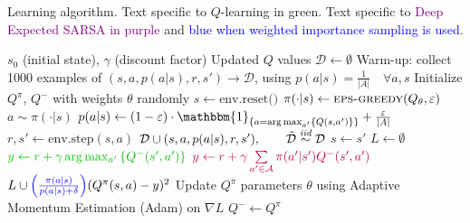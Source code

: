 \documentclass{article}
\begin{document}
\begin{algorithm}
    \caption{Learning algorithm. Text specific to \textcolor{dgreen}{\(Q\)-learning in green}. Text specific to \textcolor{purple}{Deep Expected SARSA in purple} and \textcolor{blue}{blue when weighted importance sampling is used}.}
    \begin{algorithmic}
        \Require $s_0$ (initial state), $\gamma$ (discount factor)
        \Ensure Updated $Q$ values
        \State \(\mathcal{D} \gets \emptyset\)
        \State Warm-up: collect 1000 examples of $(s, a, p(a|s), r, s') \rightarrow \mathcal{D}$, using $p(a|s) = \frac{1}{|A|} \quad \forall a, s$
        \State Initialize $Q^\pi$, $Q^-$ with weights \(\theta\) randomly
            \State $s \gets \text{env.reset()}$
                \State $\pi(\cdot | s) \gets \Call{eps-greedy}{Q_\theta, \eps}$
                \State $a \sim \pi(\cdot|s)$
                \State $p(a|s) \gets (1 - \eps) \cdot \mathbbm{1}_{\set{a = \arg\max_{a'}\set{Q(s,a')}}} + \frac{\eps}{|A|}$
                \State $r, s' \gets \text{env.step}(s, a)$
                \State $\mathcal{D} \cup (s, a, p(a|s), r, s'),\qquad \tilde{\mathcal{D}} \overset{\textit{iid}}{\sim}\mathcal{D}$
                \State $s \gets s'$
                \State $L \gets \emptyset$
                    \State $\textcolor{dgreen}{y \gets r + \gamma \arg\max_{a'}\set{Q^-(s',a')}}$
                    \State $\textcolor{purple}{y \gets r + \gamma \sum\limits_{a' \in \mathcal{A}} \pi(a' | s') Q^-(s', a')}$
                    \State $L \cup \textcolor{blue}{\left( \frac{\pi(a|s)}{p(a|s) + \delta} \right)} (Q^\pi(s, a) - y)^2$ %
                    \EndFor
                \State Update $Q^\pi$ parameters \(\theta\) using Adaptive Momentum Estimation (Adam) on \(\nabla L\)
                    \State $Q^- \gets Q^\pi$
                \EndIf
            \EndWhile
        \EndFor
    \end{algorithmic}
\end{algorithm}
\end{document}
